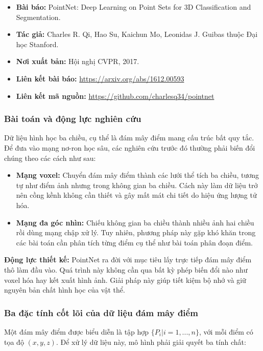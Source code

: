 \begin{itemize}
    \item \textbf{Bài báo:} PointNet: Deep Learning on Point Sets for 3D Classification and Segmentation.
    \item \textbf{Tác giả:} Charles R. Qi, Hao Su, Kaichun Mo, Leonidas J. Guibas thuộc Đại học Stanford.
    \item \textbf{Nơi xuất bản:} Hội nghị CVPR, 2017.
    \item \textbf{Liên kết bài báo:} \url{https://arxiv.org/abs/1612.00593}
    \item \textbf{Liên kết mã nguồn:} \url{https://github.com/charlesq34/pointnet}
\end{itemize}

\subsubsection{Bài toán và động lực nghiên cứu}

Dữ liệu hình học ba chiều, cụ thể là đám mây điểm mang cấu trúc bất quy tắc. Để đưa vào mạng nơ-ron học sâu, các nghiên cứu trước đó thường phải biến đổi chúng theo các cách như sau:

\begin{itemize}
    \item \textbf{Mạng voxel:} Chuyển đám mây điểm thành các lưới thể tích ba chiều, tương tự như điểm ảnh nhưng trong không gian ba chiều. Cách này làm dữ liệu trở nên cồng kềnh không cần thiết và gây mất mát chi tiết do hiệu ứng lượng tử hóa.
    \item \textbf{Mạng đa góc nhìn:} Chiếu không gian ba chiều thành nhiều ảnh hai chiều rồi dùng mạng chập xử lý. Tuy nhiên, phương pháp này gặp khó khăn trong các bài toán cần phân tích từng điểm cụ thể như bài toán phân đoạn điểm.
\end{itemize}

\textbf{Động lực thiết kế:} PointNet ra đời với mục tiêu lấy trực tiếp đám mây điểm thô làm đầu vào. Quá trình này không cần qua bất kỳ phép biến đổi nào như voxel hóa hay kết xuất hình ảnh.
 Giải pháp này giúp tiết kiệm bộ nhớ và giữ nguyên bản chất hình học của vật thể.

\subsubsection{Ba đặc tính cốt lõi của dữ liệu đám mây điểm}

Một đám mây điểm được biểu diễn là tập hợp $\{P_i | i=1,...,n\}$, với mỗi điểm có tọa độ $(x, y, z)$. Để xử lý dữ liệu này, mô hình phải giải quyết ba tính chất:

